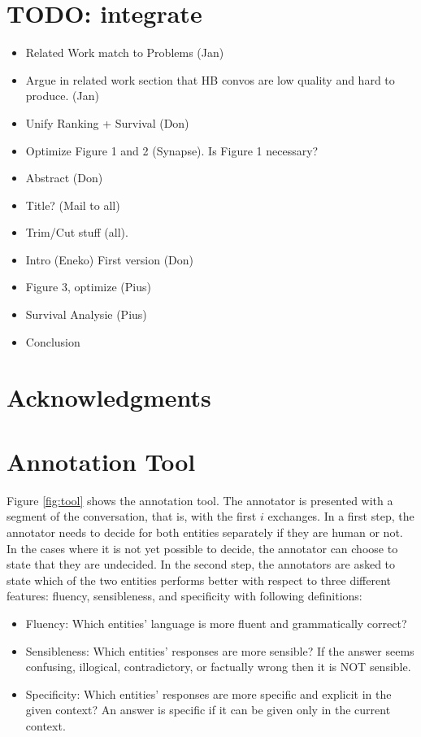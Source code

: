 \documentclass[11pt,a4paper]{article}
\begin{document}
\section*{TODO: integrate}
\begin{itemize}
    \item Related Work match to Problems (Jan)
    \item Argue in related work section that HB convos are low quality and hard to produce. (Jan)
    \item Unify Ranking  + Survival (Don) 
    \item Optimize Figure 1 and 2 (Synapse). Is Figure 1 necessary? 
    \item Abstract (Don)
    \item Title? (Mail to all)
    \item Trim/Cut stuff (all).
    \item Intro (Eneko) First version (Don)
    \item Figure 3, optimize (Pius)
    \item Survival Analysie (Pius)
    \item Conclusion
\end{itemize}

\section*{Acknowledgments}



\newpage
\appendix

\section{Annotation Tool}
Figure \ref{fig:tool} shows the annotation tool. The annotator is presented with a segment of the conversation, that is, with the first $i$ exchanges. In a first step, the annotator needs to decide for both entities separately if they are human or not. In the cases where it is not yet possible to decide, the annotator can choose to state that they are undecided. In the second step, the annotators are asked to state which of the two entities performs better with respect to three different features: fluency, sensibleness, and specificity with following definitions:
\begin{itemize}
    \item Fluency: Which entities' language is more fluent and grammatically correct?
    \item Sensibleness: Which entities' responses are more sensible? If the answer seems confusing, illogical, contradictory, or factually wrong then it is NOT sensible.
    \item Specificity: Which entities' responses are more specific and explicit in the given context? An answer is specific if it can be given only in the current context.
\end{itemize}
\end{document}
